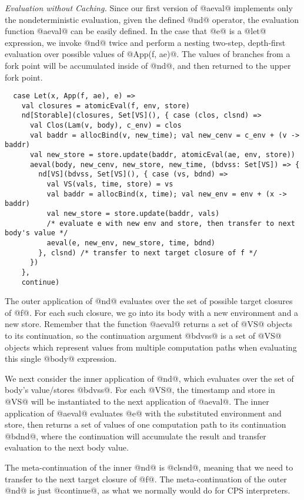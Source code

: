 \documentclass[acmsmall, review]{acmart}\settopmatter{}
\begin{document}
\textit{Evaluation without Caching.}
Since our first version of @aeval@ implements only the nondeterministic evaluation, 
given the defined @nd@ operator, the evaluation function @aeval@ can be easily defined. 
In the case that @e@ is a @let@ expression, we invoke @nd@ twice and perform a nesting 
two-step, depth-first evaluation over possible values of @App(f, ae)@.
The values of branches from a fork point will be accumulated inside of @nd@, and 
then returned to the upper fork point.

\begin{lstlisting}
  case Let(x, App(f, ae), e) =>
    val closures = atomicEval(f, env, store)
    nd[Storable](closures, Set[VS](), { case (clos, clsnd) =>
      val Clos(Lam(v, body), c_env) = clos
      val baddr = allocBind(v, new_time); val new_cenv = c_env + (v -> baddr)
      val new_store = store.update(baddr, atomicEval(ae, env, store))
      aeval(body, new_cenv, new_store, new_time, (bdvss: Set[VS]) => {
        nd[VS](bdvss, Set[VS](), { case (vs, bdnd) =>
          val VS(vals, time, store) = vs
          val baddr = allocBind(x, time); val new_env = env + (x -> baddr)
          val new_store = store.update(baddr, vals)
          /* evaluate e with new env and store, then transfer to next body's value */
          aeval(e, new_env, new_store, time, bdnd)
        }, clsnd) /* transfer to next target closure of f */
      })
    },
    continue)
\end{lstlisting}

The outer application of @nd@ evaluates over the set of possible target closures of
@f@. For each such closure, we go into its body with a new environment and a new store.
Remember that the function @aeval@ returns a set of @VS@ objects to its continuation,
so the continuation argument @bdvss@ is a set of @VS@ objects which represent values
from multiple computation paths when evaluating this single @body@ expression.

We next consider the inner application of @nd@, which evaluates over the set of body's 
value/stores @bdvss@. For each @VS@, the timestamp and store in @VS@ will be instantiated to
the next application of @aeval@. The inner application of @aeval@ evaluates @e@ with the
substituted environment and store, then returns a set of values of one computation path 
to its continuation @bdnd@, where the continuation will accumulate the result and 
transfer evaluation to the next body value.

The meta-continuation of the inner @nd@ is @clsnd@, meaning that we need to transfer 
to the next target closure of @f@. The meta-continuation of the outer @nd@ is just 
@continue@, as what we normally would do for CPS interpreters.
\end{document}
